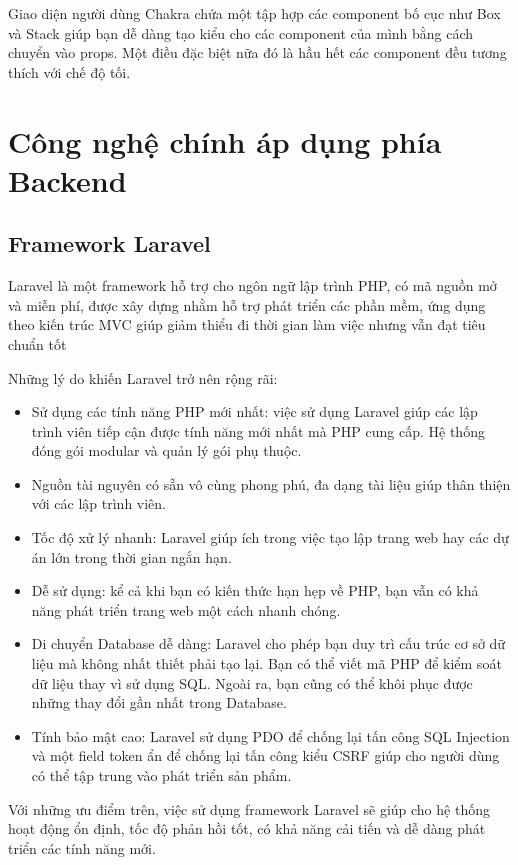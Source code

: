 \documentclass[../DoAn.tex]{subfiles}
\begin{document}
 Giao diện người dùng Chakra chứa một tập hợp các component bố cục như Box và Stack giúp bạn dễ dàng tạo kiểu cho các component của mình bằng cách chuyển vào props. Một điều đặc biệt nữa đó là hầu hết các component đều tương thích với chế độ tối.

\section{Công nghệ chính áp dụng phía Backend}
\subsection{Framework Laravel}
Laravel\cite{laravel} là một framework hỗ trợ cho ngôn ngữ lập trình PHP, có mã nguồn mở và miễn phí, được xây dựng nhằm hỗ trợ phát triển các phần mềm, ứng dụng theo kiến trúc MVC giúp giảm thiểu đi thời gian làm việc nhưng vẫn đạt tiêu chuẩn tốt

Những lý do khiến Laravel trở nên rộng rãi:
\begin{itemize}
    \item Sử dụng các tính năng PHP mới nhất: việc sử dụng Laravel giúp các lập trình viên tiếp cận được tính năng mới nhất mà PHP cung cấp. Hệ thống đóng gói modular và quản lý gói phụ thuộc.
    \item Nguồn tài nguyên có sẵn vô cùng phong phú, đa dạng tài liệu giúp thân thiện với các lập trình viên.
    \item Tốc độ xử lý nhanh: Laravel giúp ích trong việc tạo lập trang web hay các dự án lớn trong thời gian ngắn hạn.
    \item Dễ sử dụng: kể cả khi bạn có kiến thức hạn hẹp về PHP, bạn vẫn có khả năng phát triển trang web một cách nhanh chóng.
    \item Di chuyển Database dễ dàng: Laravel  cho phép bạn duy trì cấu trúc cơ sở dữ liệu mà không nhất thiết phải tạo lại. Bạn có thể viết mã PHP để kiểm soát dữ liệu thay vì sử dụng SQL. Ngoài ra, bạn cũng có thể khôi phục được những thay đổi gần nhất trong Database.
    \item Tính bảo mật cao: Laravel  sử dụng PDO để chống lại tấn công SQL Injection và một field token ẩn để chống lại tấn công kiểu CSRF giúp cho người dùng có thể tập trung vào phát triển sản phẩm.
\end{itemize}

 Với những ưu điểm trên, việc sử dụng framework Laravel sẽ giúp cho hệ thống hoạt động ổn định, tốc độ phản hồi tốt, có khả năng cải tiến và dễ dàng phát triển các tính năng mới.
\end{document}
